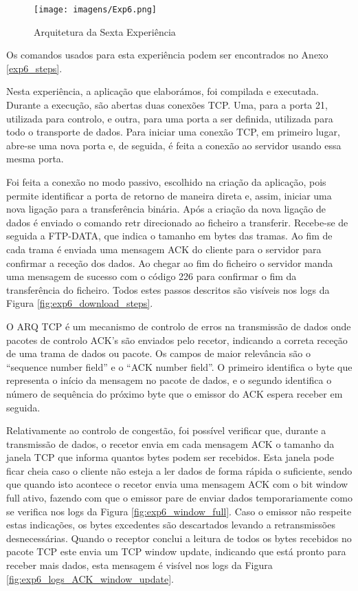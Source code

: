 \begin{figure}[h!]
\centering
\texttt{[image: imagens/Exp6.png]}
\caption{Arquitetura da Sexta Experiência}
\label{fig:exp6}
\end{figure}

Os comandos usados para esta experiência podem ser encontrados no Anexo \ref{exp6_steps}.

Nesta experiência, a aplicação que elaborámos, foi compilada e executada. Durante a execução, são abertas duas conexões TCP. Uma, para a porta 21, utilizada para controlo, e outra, para uma porta a ser definida, utilizada para todo o transporte de dados. Para iniciar uma conexão TCP, em primeiro lugar, abre-se uma nova porta e, de seguida, é feita a conexão ao servidor usando essa mesma porta.

Foi feita a conexão no modo passivo, escolhido na criação
da aplicação, pois permite identificar a porta de retorno de maneira direta e, assim, iniciar uma nova ligação para a transferência binária.
Após a criação da nova ligação de dados é enviado o comando retr direcionado ao ficheiro a transferir. Recebe-se de seguida a FTP-DATA,  que indica o tamanho em bytes das tramas. Ao fim de cada trama é enviada uma mensagem ACK do cliente para o servidor para confirmar a receção dos dados. Ao chegar ao fim do ficheiro o servidor manda uma mensagem de sucesso com o código 226 para confirmar o fim da transferência do ficheiro. Todos estes passos descritos são visíveis nos logs da Figura \ref{fig:exp6_download_steps}.

O ARQ TCP é um mecanismo de controlo de erros na transmissão de dados onde pacotes de controlo ACK's são enviados pelo recetor, indicando a correta receção de uma trama de dados ou pacote. Os campos de maior relevância são o “sequence number field” e o “ACK number field”. O primeiro identifica o byte que representa o início da mensagem no pacote de dados, e o segundo identifica o número de sequência do próximo byte que o emissor do ACK espera receber em seguida.

Relativamente ao controlo de congestão, foi possível verificar que, durante a transmissão de dados, o recetor envia em cada mensagem ACK o tamanho da janela TCP que informa quantos bytes podem ser recebidos. Esta janela pode ficar cheia caso o cliente não esteja a ler dados de forma rápida o suficiente, sendo que quando isto acontece o recetor envia uma mensagem ACK com o bit window full ativo, fazendo com que o emissor pare de enviar dados temporariamente como se verifica nos logs da Figura \ref{fig:exp6_window_full}. Caso o emissor não respeite estas indicações, os bytes excedentes são descartados levando a retransmissões desnecessárias. Quando o receptor conclui a leitura de todos os bytes recebidos no pacote TCP este envia um TCP window update, indicando que está pronto para receber mais dados, esta mensagem é visível nos logs da Figura \ref{fig:exp6_logs_ACK_window_update}.

